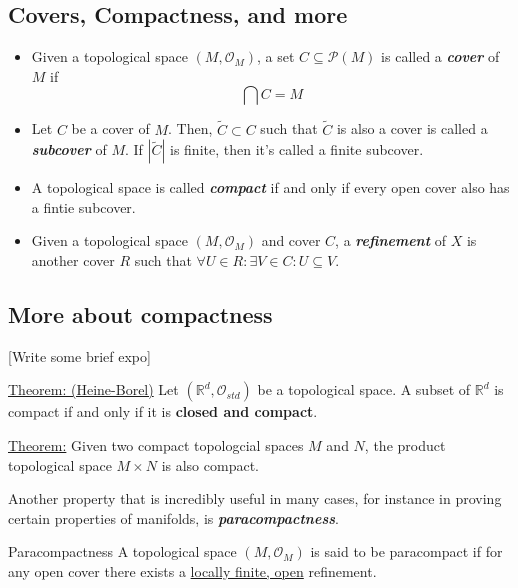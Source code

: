 \documentclass{article}
\newcommand{\R}{\mathbb{R}}
\begin{document}
\vskip 0.5cm
\subsection{Covers, Compactness, and more}
\begin{mathdefinitionbox}{}
  \begin{itemize}
    \item Given a topological space $(M, \mathcal{O}_M)$, a set $C \subseteq \mathcal{P}(M)$ is called a \emph{\textbf{cover}} of $M$ if 
    \[ \bigcap C = M \]

    \item Let $C$ be a cover of $M$. Then, $\tilde{C} \subset C$ such that $\tilde{C}$ is also a cover is called a \emph{\textbf{subcover}} of $M$. If $|\tilde{C}|$ is finite, then it's called a finite subcover.
    
    \item A topological space is called \emph{\textbf{compact}} if and only if every open cover also has a fintie subcover.
    
    \item Given a topological space $(M, \mathcal{O}_M)$ and cover $C$, a \emph{\textbf{refinement}} of $X$ is another cover $R$ such that $\forall U \in R: \exists V \in C : U \subseteq V$. 
  \end{itemize}
\end{mathdefinitionbox}

\vskip 0.5cm
\subsection*{More about compactness}
[Write some brief expo]

\begin{dottedbox}
  \underline{Theorem: (Heine-Borel)} Let $(\R^{d}, \mathcal{O}_{std})$ be a topological space. A subset of $\R^d$ is compact if and only if it is \textbf{closed and compact}.
\end{dottedbox}

\vskip 0.5cm
\begin{dottedbox}
  \underline{Theorem:} Given two compact topologcial spaces $M$ and $N$, the product topological space $M \times N$ is also compact.
\end{dottedbox}

\vskip 0.5cm
Another property that is incredibly useful in many cases, for instance in proving certain properties of manifolds, is \emph{\textbf{paracompactness}}.

\vskip 0.5cm
\begin{mathdefinitionbox}{Paracompactness}
  A topological space $(M, \mathcal{O}_M)$ is said to be paracompact if for any open cover there exists a \underline{locally finite, open} refinement.
\end{mathdefinitionbox}
\end{document}
